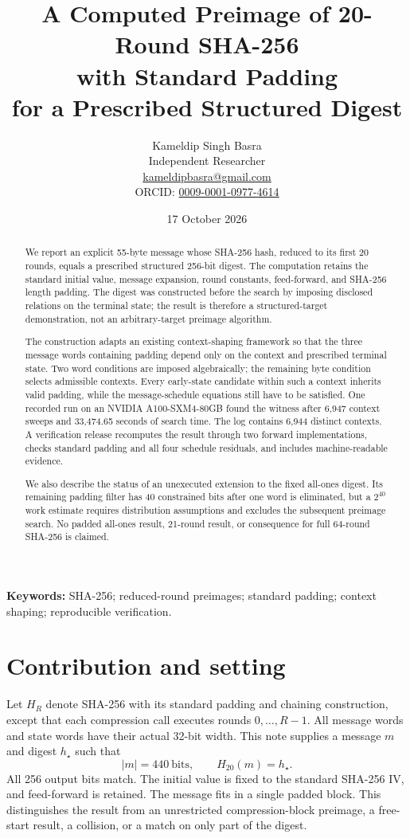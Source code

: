 \documentclass[11pt,a4paper]{article}
\title{A Computed Preimage of 20-Round SHA-256\\with Standard Padding\\for a Prescribed Structured Digest}
\author{Kameldip Singh Basra\\Independent Researcher\\\small\href{mailto:kameldipbasra@gmail.com}{kameldipbasra@gmail.com}\\\small ORCID: \href{https://orcid.org/0009-0001-0977-4614}{0009-0001-0977-4614}}
\date{17 October 2026}
\begin{document}
\maketitle
\begin{abstract}
We report an explicit 55-byte message whose SHA-256 hash, reduced to its first 20 rounds, equals a prescribed structured 256-bit digest. The computation retains the standard initial value, message expansion, round constants, feed-forward, and SHA-256 length padding. The digest was constructed before the search by imposing disclosed relations on the terminal state; the result is therefore a structured-target demonstration, not an arbitrary-target preimage algorithm.

The construction adapts an existing context-shaping framework so that the three message words containing padding depend only on the context and prescribed terminal state. Two word conditions are imposed algebraically; the remaining byte condition selects admissible contexts. Every early-state candidate within such a context inherits valid padding, while the message-schedule equations still have to be satisfied. One recorded run on an NVIDIA A100-SXM4-80GB found the witness after 6,947 context sweeps and 33,474.65 seconds of search time. The log contains 6,944 distinct contexts. A verification release recomputes the result through two forward implementations, checks standard padding and all four schedule residuals, and includes machine-readable evidence.

We also describe the status of an unexecuted extension to the fixed all-ones digest. Its remaining padding filter has 40 constrained bits after one word is eliminated, but a $2^{40}$ work estimate requires distribution assumptions and excludes the subsequent preimage search. No padded all-ones result, 21-round result, or consequence for full 64-round SHA-256 is claimed.
\end{abstract}
\noindent\textbf{Keywords:} SHA-256; reduced-round preimages; standard padding; context shaping; reproducible verification.

\section{Contribution and setting}
Let $H_R$ denote SHA-256 with its standard padding and chaining construction, except that each compression call executes rounds $0,\ldots,R-1$. All message words and state words have their actual 32-bit width. This note supplies a message $m$ and digest $h_\star$ such that
\[
 |m|=440\ \text{bits},\qquad H_{20}(m)=h_\star.
\]
All 256 output bits match. The initial value is fixed to the standard SHA-256 IV, and feed-forward is retained. The message fits in a single padded block. This distinguishes the result from an unrestricted compression-block preimage, a free-start result, a collision, or a match on only part of the digest.
\end{document}
